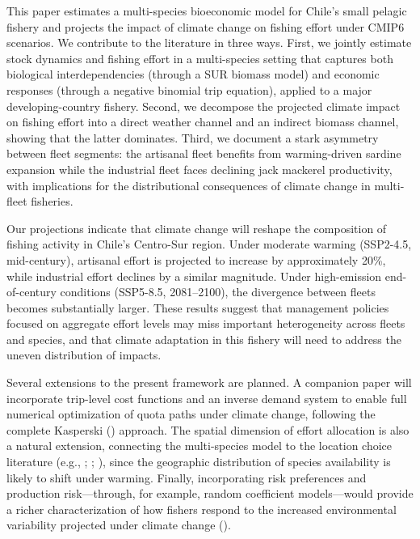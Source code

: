 \documentclass[
  11pt,
]{article}
\begin{document}
This paper estimates a multi-species bioeconomic model for Chile's small pelagic fishery and projects the impact of climate change on fishing effort under CMIP6 scenarios. We contribute to the literature in three ways. First, we jointly estimate stock dynamics and fishing effort in a multi-species setting that captures both biological interdependencies (through a SUR biomass model) and economic responses (through a negative binomial trip equation), applied to a major developing-country fishery. Second, we decompose the projected climate impact on fishing effort into a direct weather channel and an indirect biomass channel, showing that the latter dominates. Third, we document a stark asymmetry between fleet segments: the artisanal fleet benefits from warming-driven sardine expansion while the industrial fleet faces declining jack mackerel productivity, with implications for the distributional consequences of climate change in multi-fleet fisheries.

Our projections indicate that climate change will reshape the composition of fishing activity in Chile's Centro-Sur region. Under moderate warming (SSP2-4.5, mid-century), artisanal effort is projected to increase by approximately 20\%, while industrial effort declines by a similar magnitude. Under high-emission end-of-century conditions (SSP5-8.5, 2081--2100), the divergence between fleets becomes substantially larger. These results suggest that management policies focused on aggregate effort levels may miss important heterogeneity across fleets and species, and that climate adaptation in this fishery will need to address the uneven distribution of impacts.

Several extensions to the present framework are planned. A companion paper will incorporate trip-level cost functions and an inverse demand system to enable full numerical optimization of quota paths under climate change, following the complete Kasperski () approach. The spatial dimension of effort allocation is also a natural extension, connecting the multi-species model to the location choice literature (e.g., ; ; ), since the geographic distribution of species availability is likely to shift under warming. Finally, incorporating risk preferences and production risk---through, for example, random coefficient models---would provide a richer characterization of how fishers respond to the increased environmental variability projected under climate change ().
\end{document}
